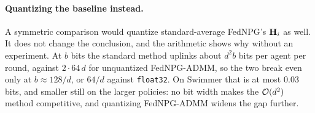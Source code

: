 \paragraph{Quantizing the baseline instead.} A symmetric comparison would
quantize standard-average FedNPG's $\mathbf{H}_i$ as well. It does not change the
conclusion, and the arithmetic shows why without an experiment. At $b$ bits the
standard method uplinks about $d^2 b$ bits per agent per round, against
$2 \cdot 64\, d$ for unquantized FedNPG-ADMM, so the two break even only at
$b \approx 128/d$, or $64/d$ against \texttt{float32}. On Swimmer that is at
most $0.03$ bits, and smaller still on the
larger policies: no bit width makes the $\mathcal{O}(d^2)$ method competitive, and
quantizing FedNPG-ADMM widens the gap further.
